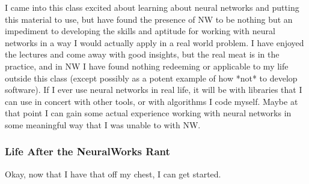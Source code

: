 \documentclass[12pt]{article}
\begin{document}
I came into this class excited about learning about neural networks and putting this material to use, but have found the presence of NW to be nothing but an impediment to developing the skills and aptitude for working with neural networks in a way I would actually apply in a real world problem.  I have enjoyed the lectures and come away with good insights, but the real meat is in the practice, and in NW I have found nothing redeeming or applicable to my life outside this class (except possibly as a potent example of how *not* to develop software).  If I ever use neural networks in real life, it will be with libraries that I can use in concert with other tools, or with algorithms I code myself.  Maybe at that point I can gain some actual experience working with neural networks in some meaningful way that I was unable to with NW.

\subsubsection{Life After the NeuralWorks Rant}

Okay, now that I have that off my chest, I can get started.  
\end{document}
